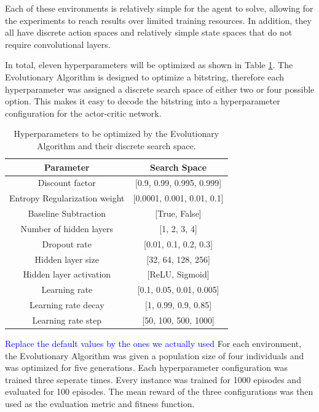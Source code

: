 \documentclass{article}
\newcommand{\TODO}[1]{\textcolor{blue}{#1}}
\begin{document}
Each of these environments is relatively simple for the agent to solve, allowing for the experiments to reach results over limited training resources. 
In addition, they all have discrete action spaces and relatively simple state spaces that do not require convolutional layers.

In total, eleven hyperparameters will be optimized as shown in Table \ref{tab:optimized_parameters}. 
The Evolutionary Algorithm is designed to optimize a bitstring, therefore each hyperparameter was assigned a discrete search space of either two or four possible option. 
This makes it easy to decode the bitstring into a hyperparameter configuration for the actor-critic network. 

\begin{table}[htbp]
    \centering
    \begin{tabular}
        {|c|c|}
        \toprule
        \textbf{Parameter} & \textbf{Search Space} \\
        \midrule
        Discount factor & [0.9, 0.99, 0.995, 0.999] \\
        Entropy Regularization weight & [0.0001, 0.001, 0.01, 0.1] \\
        Baseline Subtraction & [True, False] \\
        \midrule
        Number of hidden layers & [1, 2, 3, 4] \\
        Dropout rate & [0.01, 0.1, 0.2, 0.3] \\
        Hidden layer size & [32, 64, 128, 256] \\
        Hidden layer activation & [ReLU, Sigmoid] \\
        \midrule
        Learning rate & [0.1, 0.05, 0.01, 0.005] \\
        Learning rate decay & [1, 0.99, 0.9, 0.85] \\
        Learning rate step & [50, 100, 500, 1000] \\
        \bottomrule
    \end{tabular}
    \caption{Hyperparameters to be optimized by the Evolutionary Algorithm and their discrete search space. }
    \label{tab:optimized_parameters}
\end{table}

\TODO{Replace the default values by the ones we actually used}
For each environment, the Evolutionary Algorithm was given a population size of four individuals and was optimized for five generations. 
Each hyperparameter configuration was trained three seperate times. Every instance was trained for 1000 episodes and evaluated for 100 episodes.
The mean reward of the three configurations was then used as the evaluation metric and fitness function.   
\end{document}
